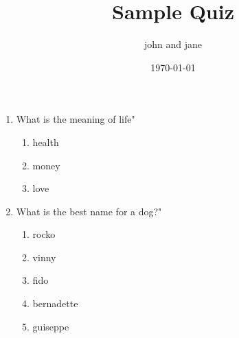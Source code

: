 \documentclass{article}
\title{Sample Quiz}
\date\today
\author{john and jane}
\begin{document}
\maketitle

\begin{enumerate}
	\item What is the meaning of life"
	\begin{enumerate}
					\item health
					\item money
					\item love
			\end{enumerate}
	\item What is the best name for a dog?"
	\begin{enumerate}
					\item rocko
					\item vinny
					\item fido
					\item bernadette
					\item guiseppe
			\end{enumerate}
\end{enumerate}
\end{document}
